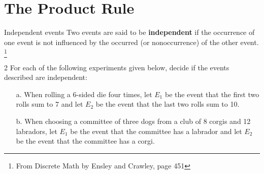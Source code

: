 \documentclass[a4paper,12pt]{book}
\newcounter{question}
\begin{document}
    \newpage
    \section{The Product Rule}

        \begin{intro}{Independent events}
            Two events are said to be \textbf{independent} if the occurrence
            of one event is not influenced by the occurred (or nonoccurrence)
            of the other event.
            \footnote{From Discrete Math by Ensley and Crawley, page 451}
        \end{intro}

        
        \begin{question}{\thequestion}{2}
            For each of the following experiments given below,
            decide if the events described are independent:

            \begin{itemize}
                \item[a.] When rolling a 6-sided die four times, let $E_{1}$
                    be the event that the first two rolls sum to 7 and let $E_{2}$
                    be the event that the last two rolls sum to 10. ~\\

                \item[b.] When choosing a committee of three dogs from a club of
                    8 corgis and 12 labradors, let $E_{1}$ be the event that
                    the committee has a labrador and let $E_{2}$ be the
                    event that the committee has a corgi. ~\\
                
            \end{itemize}
        \end{question}
\end{document}

